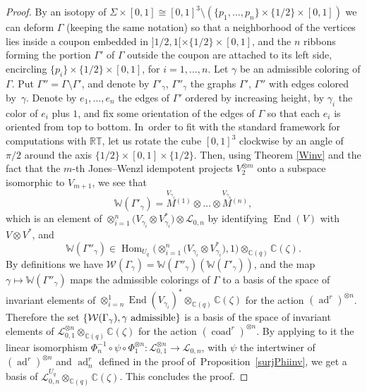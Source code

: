\documentclass[pdftex]{sigma}%
\numberwithin{equation}{section}
\numberwithin{figure}{section}
\newcommand{\mc}{\mathbb{C}}
\newcommand{\Ll}{{\mathcal L}}
\newcommand{\ra}{\rightarrow}
\begin{document}
\begin{proof}
By an isotopy of $\Sigma\times [0,1]\cong [0,1]^3\setminus (\{p_1,\dots,p_n\}\times \{1/2\}\times [0,1])$ we can deform $\Gamma$ (keeping the same notation) so that a neighborhood of the vertices lies inside a coupon embedded in $]1/2,1[\times \{1/2\} \times [0,1]$, and the $n$ ribbons forming the portion $\Gamma'$ of $\Gamma$ outside the coupon are attached to its left side, encircling $\{p_i\}\times \{1/2\} \times [0,1]$, for $i=1,\dots,n$. Let $\gamma$ be an admissible coloring of $\Gamma$. Put $\Gamma'' = \Gamma \setminus \Gamma'$, and denote by $\Gamma'_\gamma$, $\Gamma''_\gamma$ the graphs $\Gamma'$, $\Gamma''$ with edges colored by~$\gamma$. Denote by $e_1,\dots,e_n$ the edges of $\Gamma'$ ordered by increasing height, by $\gamma_i$ the color of $e_i$ plus $1$, and fix some orientation of the edges of $\Gamma$ so that each $e_i$ is oriented from top to bottom. In~order to fit with the standard framework for computations with $\mathbb{RT}$, let us rotate the cube $[0,1]^3$ clockwise by an angle of $\pi/2$ around the axis $\{1/2\}\times [0,1]\times \{1/2\}$. Then, using Theorem \ref{Winv} and the fact that the $m$-th Jones--Wenzl idempotent projects $V_2^{\otimes m}$ onto a subspace isomorphic to $V_{m+1}$, we see that
\[
\mathbb{W}(\Gamma'_\gamma) = \stackrel{V_{\gamma_1}}{M}{}^{\!\!(1)}\otimes \dots \otimes \stackrel{V_{\gamma_n}}{M}{}^{\!\!(n)},
\]
which is an element of $\otimes_{i=1}^n \big(V_{\gamma_i}\otimes V_{\gamma_i}^*\big)\otimes \Ll_{0,n}$ by identifying $\operatorname{End}(V)$ with $V\otimes V^*$, and
\[
\mathbb{W}(\Gamma''_\gamma) \in \operatorname{Hom}_{U_q}\big(\otimes_{i=1}^n \big(V_{\gamma_i}\otimes V_{\gamma_i}^*\big),1\big) \otimes_{\mc(q)} \mc(\zeta).
\]
By definitions we have $\mathcal{W}(\Gamma_\gamma) = \mathbb{W}(\Gamma''_\gamma)(\mathbb{W}(\Gamma'_\gamma))$, and the map $\gamma \mapsto \mathbb{W}(\Gamma''_\gamma)$ maps the admissible colorings of $\Gamma$ to a basis of the space of invariant elements of $\otimes_{i=n}^1 \operatorname{End}(V_{\gamma_i})^*\otimes_{\mc(q)} \mc(\zeta)$ for the action $(\operatorname{ad}^r)^{\otimes n}$. Therefore the set $\{\mathcal{W}(\Gamma_\gamma),\gamma\ {\rm admissible}\}$ is a basis of the space of invariant elements of $\Ll_{0,1}^{\otimes n}\otimes_{\mc(q)} \mc(\zeta)$ for the action $(\operatorname{coad}^r)^{\otimes n}$. By applying to it the linear isomorphism $\Phi_n^{-1}\circ \psi\circ \Phi_1^{\otimes n}\colon \Ll_{0,1}^{\otimes n} \ra \Ll_{0,n}$, with $\psi$ the intertwiner of $(\operatorname{ad}^r)^{\otimes n}$ and $\operatorname{ad}^r_n$ defined in the proof of~Pro\-position~\ref{surjPhiinv}, we get a basis of $\Ll_{0,n}^{U_q}\otimes_{\mc(q)} \mc(\zeta)$. This concludes the proof.
\end{proof}
\end{document}

